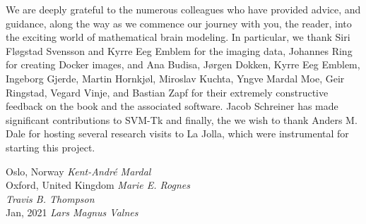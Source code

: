 We are deeply grateful to the numerous colleagues who have provided
advice, and guidance, along the way as we commence our journey with
you, the reader, into the exciting world of mathematical brain
modeling. In particular, we thank Siri Fl\o gstad Svensson and Kyrre
Eeg Emblem for the imaging data, Johannes Ring for creating Docker
images, and Ana Budisa, J\o rgen Dokken, Kyrre Eeg Emblem, Ingeborg
Gjerde, Martin Hornkj\o l, Miroslav Kuchta, Yngve Mardal Moe, Geir
Ringstad, Vegard Vinje, and Bastian Zapf for their extremely
constructive feedback on the book and the associated software.  Jacob
Schreiner has made significant contributions to SVM-Tk and finally,
the we wish to thank Anders M. Dale for hosting several research
visits to La Jolla, which were instrumental for starting this project.


\vspace{\baselineskip}
\begin{flushright}\noindent
Oslo, Norway \hfill {\it Kent-Andr\'e Mardal}\\ 
Oxford, United Kingdom   \hfill {\it Marie E. Rognes}\\ 
             \hfill {\it Travis B. Thompson}\\ 
Jan, 2021    \hfill {\it Lars Magnus Valnes}\\ 
\end{flushright}


